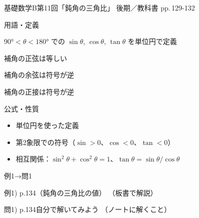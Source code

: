 \documentclass[aspectratio=43,professionalfonts,handout]{beamer}
\newcommand{\LectureNum}{11}
\newcommand{\LectureTitle}{鈍角の三角比}
\newcommand{\TextPages}{pp.\,129-132}
\newcommand{\CourseName}{基礎数学B}
\renewcommand{\TermName}{後期}
\begin{document}
\begin{frame}{\CourseName\quad 第\LectureNum 回「\LectureTitle 」}
  {\small \TermName\quad \TeacherName\quad ／\quad 教科書 \TextPages}

  \begin{block}{用語・定義}
  \begin{description}[labelwidth=5.5em]
    \item[\kw{鈍角（$90° < \theta < 180°$）の三角比}] $90° < \theta < 180°$ での $\sin\theta$, $\cos\theta$, $\tan\theta$ を単位円で定義
    \item[\kw{$\sin(180° - \theta) = \sin\theta$}] 補角の正弦は等しい
    \item[\kw{$\cos(180° - \theta) = -\cos\theta$}] 補角の余弦は符号が逆
    \item[\kw{$\tan(180° - \theta) = -\tan\theta$}] 補角の正接は符号が逆
  \end{description}
  \end{block}
\end{frame}

\begin{frame}{公式・性質}
  \begin{block}{}
  \begin{itemize}
    \item 単位円を使った定義
    \item 第2象限での符号（$\sin > 0$、$\cos < 0$、$\tan < 0$）
    \item 相互関係：$\sin^2\theta + \cos^2\theta = 1$、$\tan\theta = \sin\theta/\cos\theta$
  \end{itemize}
  \end{block}
\end{frame}

\begin{frame}{例1→問1}
  \begin{exampleblock}{例1) p.134（鈍角の三角比の値）}
    （板書で解説）
  \end{exampleblock}

  \vfill

  \begin{block}{問1) p.134\quad 自分で解いてみよう}
    （ノートに解くこと）
  \end{block}
\end{frame}
\end{document}
